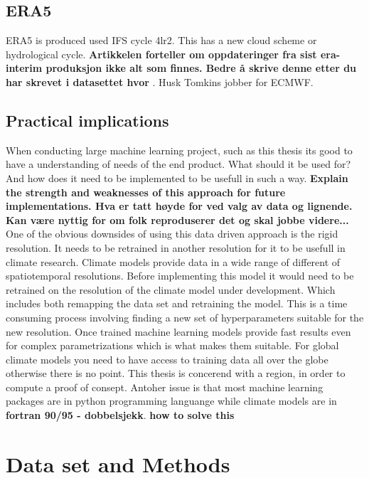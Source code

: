 \subsection{ERA5} \label{sec:param_ERA5}
ERA5 is produced used IFS cycle 4lr2. This has a new cloud scheme or hydrological cycle. \textbf{Artikkelen forteller om oppdateringer fra sist era-interim produksjon ikke alt som finnes. Bedre å skrive denne etter du har skrevet i datasettet hvor }. Husk Tomkins jobber for ECMWF.


\subsection{Practical implications} \label{sec:practical_implications}
When conducting large machine learning project, such as this thesis its good to have a understanding of needs of the end product. What should it be used for? And how does it need to be implemented to be usefull in such a way. 
\textbf{Explain the strength and weaknesses of this approach for future implementations. Hva er tatt høyde for ved valg av data og lignende. Kan være nyttig for om folk reproduserer det og skal jobbe videre...}
One of the obvious downsides of using this data driven approach is the rigid resolution. It needs to be retrained in another resolution for it to be usefull in climate research. Climate models provide data in a wide range of different of spatiotemporal resolutions. Before implementing this model it would need to be retrained on the resolution of the climate model under development. Which includes both remapping the data set and retraining the model. This is a time consuming process involving finding a new set of hyperparameters suitable for the new resolution. Once trained machine learning models provide fast results even for complex parametrizations which is what makes them suitable. For global climate models you need to have access to training data all over the globe otherwise there is no point. This thesis is concerend with a region, in order to compute a proof of consept. Antoher issue is that most machine learning packages are in python programming languange while climate models are in \textbf{fortran 90/95 - dobbelsjekk}. \textbf{how to solve this}

\section{Data set and Methods}
